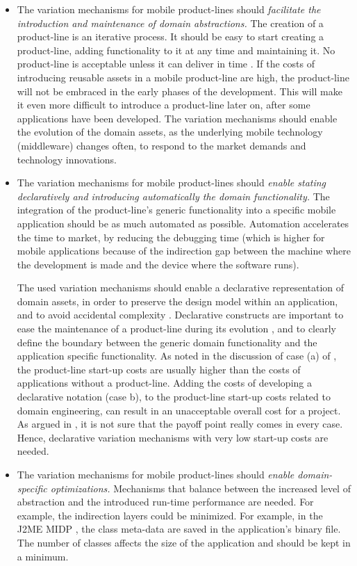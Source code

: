 \begin{itemize}
\item The variation mechanisms for mobile product-lines should \textit{facilitate the introduction and maintenance of domain abstractions.} The creation of a product-line is an iterative process. It should be easy to start creating a product-line, adding functionality to it at any time and maintaining it. No product-line is acceptable unless it can deliver in time \cite{sf.04}. If the costs of introducing reusable assets in a mobile product-line are high, the product-line will not be embraced in the early phases of the development. This will make it even more difficult to introduce a product-line later on, after some applications have been developed. The variation mechanisms should enable the evolution of the domain assets, as the underlying mobile technology (middleware) changes often, to respond to the market demands and technology innovations.

\item The variation mechanisms for mobile product-lines should \textit{enable stating declaratively and introducing automatically the domain functionality.} The integration of the product-line's generic functionality into a specific mobile application should be as much automated as possible. Automation accelerates the time to market, by reducing the debugging time (which is higher for mobile applications because of the indirection gap between the machine where the development is made and the device where the software runs).

The used variation mechanisms should enable a declarative representation of domain assets, in order to preserve the design model within an application, and to avoid accidental complexity \cite{brooks.87}. Declarative constructs are important to ease the maintenance of a product-line during its evolution \cite{Pussinen.2002}, and to clearly define the boundary between the generic domain functionality and the application specific functionality.
%
As noted in the discussion of case (a) of , the product-line start-up costs are usually higher than the costs of applications without a product-line. Adding the costs of developing a declarative notation (case b), to the product-line start-up costs related to domain engineering, can result in an unacceptable overall cost for a project. As argued in \cite{hudak98modular}, it is not sure that the payoff point really comes in every case. Hence, declarative variation mechanisms with very low start-up costs are needed.

\item The variation mechanisms for mobile product-lines should \textit{enable domain-specific optimizations.} Mechanisms that balance between the increased level of abstraction and the introduced run-time performance are needed. For example, the indirection layers could be minimized. For example, in the J2ME MIDP \cite{www.j2me}, the class meta-data are saved in the application's binary file. The number of classes affects the size of the application and should be kept in a minimum.

\end{itemize}

